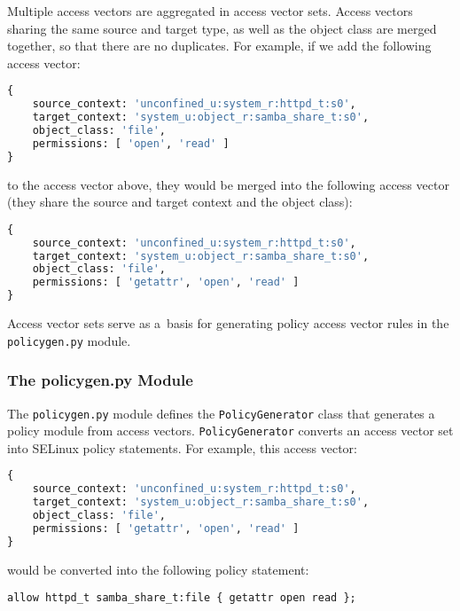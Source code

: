 Multiple access vectors are aggregated in access vector sets. Access vectors
sharing the same source and target type, as well as the object class are merged
together, so that there are no duplicates. For example, if we add the following
access vector:
\begin{lstlisting}[language=Python]
{
    source_context: 'unconfined_u:system_r:httpd_t:s0',
    target_context: 'system_u:object_r:samba_share_t:s0',
    object_class: 'file',
    permissions: [ 'open', 'read' ]
}
\end{lstlisting}
to the access vector above, they would be merged into the following access
vector (they share the source and target context and the object class):
\begin{lstlisting}[language=Python]
{
    source_context: 'unconfined_u:system_r:httpd_t:s0',
    target_context: 'system_u:object_r:samba_share_t:s0',
    object_class: 'file',
    permissions: [ 'getattr', 'open', 'read' ]
}
\end{lstlisting}

Access vector sets serve as a~basis for generating policy access vector rules
in the \texttt{policygen.py} module.

\subsubsection{The policygen.py Module}
The \texttt{policygen.py} module defines the \texttt{PolicyGenerator} class that
generates a policy module from access vectors. \texttt{PolicyGenerator} converts
an access vector set into SELinux policy statements. For example, this access
vector:
\begin{lstlisting}[language=Python]
{
    source_context: 'unconfined_u:system_r:httpd_t:s0',
    target_context: 'system_u:object_r:samba_share_t:s0',
    object_class: 'file',
    permissions: [ 'getattr', 'open', 'read' ]
}
\end{lstlisting}
would be converted into the following policy statement:
\begin{lstlisting}
allow httpd_t samba_share_t:file { getattr open read };
\end{lstlisting}

